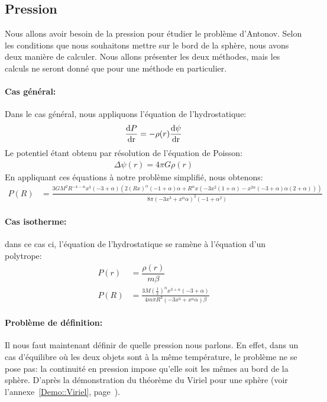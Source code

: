 \subsection{Pression}
	Nous allons avoir besoin de la pression pour étudier le problème d'Antonov. Selon les conditions que nous souhaitons mettre sur le bord de la sphère, nous
	avons deux manière de calculer. Nous allons présenter les deux méthodes, mais les calculs ne
	seront donné que pour une méthode en particulier.

	\paragraph{Cas \og général\fg:} Dans le cas \og général\fg, nous appliquons
		l'équation de l'hydrostatique:
		\begin{align}
			\dfrac{\mathrm{d}P}{\mathrm{dr}} = -\rho(r) \dfrac{\mathrm{d}\psi}{\mathrm{dr}}
		\end{align}
		Le potentiel étant obtenu par résolution de l'équation de Poisson:
		\begin{align}
			\Delta\psi(r) = 4\pi G \rho(r)
		\end{align}
		En appliquant ces équations à notre problème simplifié, nous obtenons:
		\begin{align}
			P(R) &= \frac{3 G M^2 R^{-4-\alpha } x^3 (-3+\alpha ) \left(2 (R x)^{\alpha }
(-1+\alpha ) \alpha +R^{\alpha } x \left(-3 x^2 (1+\alpha )-x^{2 \alpha } (-3+\alpha ) \alpha  (2+\alpha
)\right)\right)}{8 \pi  \left(-3 x^3+x^{\alpha } \alpha \right)^2 \left(-1+\alpha ^2\right)}
		\end{align}
	\paragraph{Cas isotherme:} dans ce cas ci, l'équation de l'hydrostatique se
		ramène à l'équation d'un polytrope:
		\begin{align}
			P(r) &= \dfrac{\rho(r)}{m\beta}\\
			P(R) &= \frac{3 M \left(\frac{1}{x}\right)^{\alpha } x^{3+\alpha } (-3+\alpha )}{4 m \pi
R^3 \left(-3 x^3+x^{\alpha } \alpha \right) \beta }
		\end{align}

	\paragraph{Problème de définition:}
		Il nous faut maintenant définir de quelle pression nous parlons. En effet, dans un cas
		d'équilibre où les deux objets sont à la même température, le problème ne se pose pas: la
		continuité en pression impose qu'elle soit les mêmes au bord de la sphère. D'après la
		démonstration du théorème du Viriel pour une sphère (voir l'annexe~\ref{Demo::Viriel}, page~\pageref{Demo::Viriel}).

